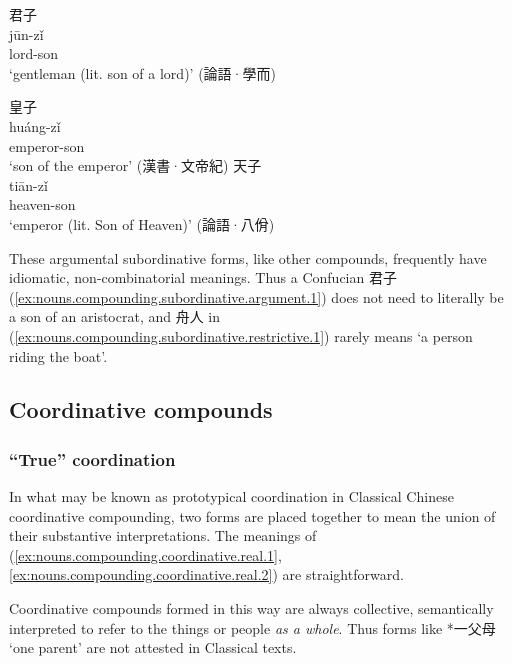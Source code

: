 \documentclass[UTF8, a4paper, oneside, scheme=plain, 12pt]{ctexrep}
\newcommand{\translate}[1]{`#1'}
\begin{document}
\begin{exe}
    \ex\label{ex:nouns.compounding.subordinative.argument.1}
    \glll 君子 \\
    jūn-zǐ \\
    lord-son \\
    \glt\translate{gentleman (lit. son of a lord)} \hfill (論語·學而)
    \ex\label{ex:nouns.compounding.subordinative.argument.2} 
    \begin{xlist}
        \ex 
        \glll 皇子 \\ 
        huáng-zǐ \\ 
        emperor-son \\ 
        \glt\translate{son of the emperor} \hfill (漢書·文帝紀)
        \ex 
        \glll 天子 \\ 
        tiān-zǐ \\ 
        heaven-son \\ 
        \glt\translate{emperor (lit. Son of Heaven)} \hfill (論語·八佾)
    \end{xlist}
\end{exe}

These argumental subordinative forms, like other compounds, frequently have idiomatic, non-combinatorial meanings.
Thus a Confucian 君子 (\ref{ex:nouns.compounding.subordinative.argument.1}) does not need to literally be a son of an aristocrat,
and 舟人 in (\ref{ex:nouns.compounding.subordinative.restrictive.1})
rarely means \translate{a person riding the boat}.


\subsection{Coordinative compounds}

\subsubsection{``True'' coordination}\label{sec:nouns.compounding.coordinative.real}

In what may be known as prototypical coordination in Classical Chinese coordinative compounding,
two forms are placed together to mean the union of their substantive interpretations.
The meanings of (\ref{ex:nouns.compounding.coordinative.real.1}, \ref{ex:nouns.compounding.coordinative.real.2}) are straightforward.

Coordinative compounds formed in this way are always collective,
semantically interpreted to refer to the things or people \emph{as a whole}. 
Thus forms like *一父母 \translate{one parent} are not attested in Classical texts.
\end{document}
